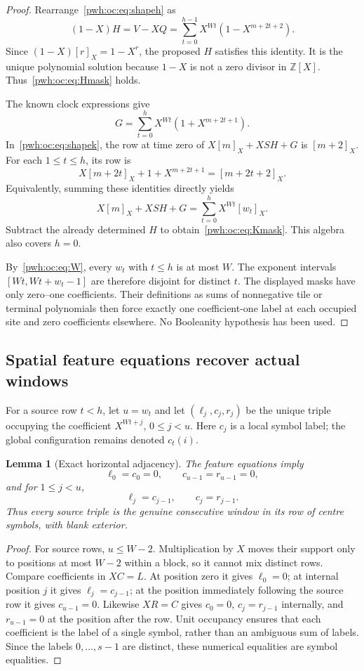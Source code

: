 \documentclass[11pt,letterpaper]{article}
\numberwithin{equation}{section}
\newtheorem{lemma}[theorem]{Lemma}
\theoremstyle{definition}
\newcommand{\Z}{\mathbb Z}
\newcommand{\rep}[1]{[#1]_X}
\begin{document}
\begin{proof}
Rearrange~\eqref{pwh:oc:eq:shapeh} as
\[
 (1-X)H=V-XQ
       =\sum_{t=0}^{h-1}X^{Wt}(1-X^{m+2t+2}).
\]
Since $(1-X)\rep r=1-X^r$, the proposed $H$ satisfies this identity.
It is the unique polynomial solution because $1-X$ is not a zero divisor
in $\Z[X]$. Thus~\eqref{pwh:oc:eq:Hmask} holds.

The known clock expressions give
\begin{equation}
 G=\sum_{t=0}^{h}X^{Wt}(1+X^{m+2t+1}).
 \label{pwh:oc:eq:Gmask}
\end{equation}
In~\eqref{pwh:oc:eq:shapek}, the row at time zero of
$X\rep m+XSH+G$ is $\rep{m+2}$. For each $1\le t\le h$, its row
is
\[
 X\rep{m+2t}+1+X^{m+2t+1}=\rep{m+2t+2}.
\]
Equivalently, summing these identities directly yields
\[
 X\rep m+XSH+G=\sum_{t=0}^{h}X^{Wt}\rep{w_t}.
\]
Subtract the already determined $H$ to obtain~\eqref{pwh:oc:eq:Kmask}.
This algebra also covers $h=0$.

By~\eqref{pwh:oc:eq:W}, every $w_t$ with $t\le h$ is at most $W$.
The exponent intervals $[Wt,Wt+w_t-1]$ are therefore disjoint for
distinct $t$. The displayed masks have only zero--one coefficients.
Their definitions as sums of nonnegative tile or terminal polynomials
then force exactly one coefficient-one label at each occupied site and
zero coefficients elsewhere. No Booleanity hypothesis has been used.
\end{proof}

\subsection{Spatial feature equations recover actual windows}

For a source row $t<h$, let $u=w_t$ and let
$(\ell_j,c_j,r_j)$ be the unique triple occupying the coefficient
$X^{Wt+j}$, $0\le j<u$. Here $c_j$ is a local symbol label; the global
configuration remains denoted $c_t(i)$.

\begin{lemma}[Exact horizontal adjacency]
\label{pwh:oc:lem:adjacency}
The feature equations imply
\[
 \ell_0=c_0=0,\qquad c_{u-1}=r_{u-1}=0,
\]
and for $1\le j<u$,
\[
 \ell_j=c_{j-1},\qquad c_j=r_{j-1}.
\]
Thus every source triple is the genuine consecutive window in its row of
centre symbols, with blank exterior.
\end{lemma}

\begin{proof}
For source rows, $u\le W-2$. Multiplication by $X$ moves their support
only to positions at most $W-2$ within a block, so it cannot mix distinct
rows. Compare coefficients in $XC=L$. At position zero it gives
$\ell_0=0$; at internal position $j$ it gives $\ell_j=c_{j-1}$; at the
position immediately following the source row it gives $c_{u-1}=0$.
Likewise $XR=C$ gives $c_0=0$, $c_j=r_{j-1}$ internally, and
$r_{u-1}=0$ at the position after the row. Unit occupancy ensures that
each coefficient is the label of a single symbol, rather than an
ambiguous sum of labels. Since the labels $0,\ldots,s-1$ are distinct,
these numerical equalities are symbol equalities.
\end{proof}
\end{document}
